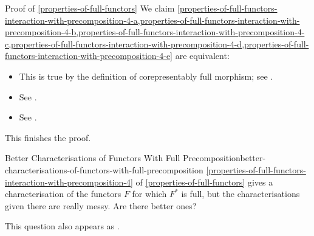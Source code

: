 \begin{Proof}{Proof of \cref{properties-of-full-functors}}
    We claim \cref{properties-of-full-functors-interaction-with-precomposition-4-a,properties-of-full-functors-interaction-with-precomposition-4-b,properties-of-full-functors-interaction-with-precomposition-4-c,properties-of-full-functors-interaction-with-precomposition-4-d,properties-of-full-functors-interaction-with-precomposition-4-e} are equivalent:
    \begin{itemize}
        \item{}This is true by the definition of corepresentably full morphism; see .
        \item{}See .
        \item{}See \cite[Item (b) of Remark 4.3]{on-functors-which-are-lax-epimorphisms}.
    \end{itemize}
    This finishes the proof.
\end{Proof}
\begin{question}{Better Characterisations of Functors With Full Precomposition}{better-characterisations-of-functors-with-full-precomposition}%
    \cref{properties-of-full-functors-interaction-with-precomposition-4} of \cref{properties-of-full-functors} gives a characterisation of the functors $F$ for which $F^{*}$ is full, but the characterisations given there are really messy. Are there better ones?

    This question also appears as \cite{MO468121}.
\end{question}

